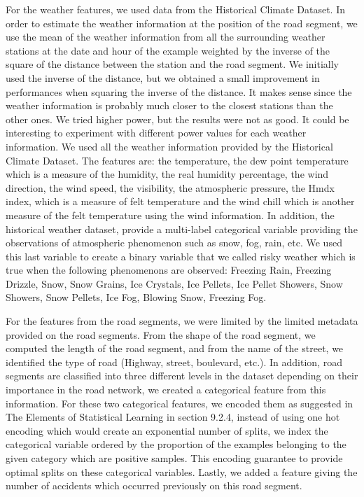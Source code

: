 \documentclass[conference]{IEEEtran}
\begin{document}
For the weather features, we used data from the Historical Climate Dataset.
In order to estimate the weather information at the position of the road segment, we use the mean of the weather information from all the surrounding weather stations at the date and hour of the example weighted by the inverse of the square of the distance between the station and the road segment.
We initially used the inverse of the distance, but we obtained a small improvement in performances when squaring the inverse of the distance.
It makes sense since the weather information is probably much closer to the closest stations than the other ones.
We tried higher power, but the results were not as good.
It could be interesting to experiment with different power values for each weather information.
We used all the weather information provided by the Historical Climate Dataset.
The features are: the temperature, the dew point temperature which is a measure of the humidity, the real humidity percentage, the wind direction, the wind speed, the visibility, the atmospheric pressure, the Hmdx index, which is a measure of felt temperature and the wind chill which is another measure of the felt temperature using the wind information.
In addition, the historical weather dataset, provide a multi-label categorical variable providing the observations of atmospheric phenomenon such as snow, fog, rain, etc.
We used this last variable to create a binary variable that we called risky weather which is true when the following phenomenons are observed: Freezing Rain, Freezing Drizzle, Snow, Snow Grains, Ice Crystals, Ice Pellets, Ice Pellet Showers, Snow Showers, Snow Pellets, Ice Fog, Blowing Snow, Freezing Fog.

For the features from the road segments, we were limited by the limited metadata provided on the road segments.
From the shape of the road segment, we computed the length of the road segment, and from the name of the street, we identified the type of road (Highway, street, boulevard, etc.).
In addition, road segments are classified into three different levels in the dataset depending on their importance in the road network, we created a categorical feature from this information.
For these two categorical features, we encoded them as suggested in The Elements of Statistical Learning\cite{elementsofstat} in section 9.2.4, instead of using one hot encoding which would create an exponential number of splits, we index the categorical variable ordered by the proportion of the examples belonging to the given category which are positive samples.
This encoding guarantee to provide optimal splits on these categorical variables.
Lastly, we added a feature giving the number of accidents which occurred previously on this road segment.
\end{document}
